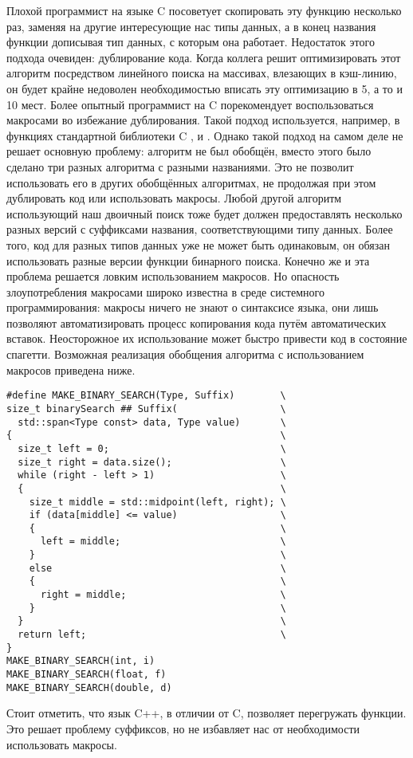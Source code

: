 Плохой программист на языке C посоветует скопировать эту функцию несколько раз, заменяя  на другие интересующие нас типы данных, а в конец названия функции дописывая тип данных, с которым она работает.
Недостаток этого подхода очевиден: дублирование кода.
Когда коллега решит оптимизировать этот алгоритм посредством линейного поиска на массивах, влезающих в кэш-линию, он будет крайне недоволен необходимостью вписать эту оптимизацию в 5, а то и 10 мест.
Более опытный программист на C порекомендует воспользоваться макросами во избежание дублирования.
Такой подход используется, например, в функциях стандартной библиотеки C ,  и .
Однако такой подход на самом деле не решает основную проблему: алгоритм не был обобщён, вместо этого было сделано три разных алгоритма с разными названиями.
Это не позволит использовать его в других обобщённых алгоритмах, не продолжая при этом дублировать код или использовать макросы.
Любой другой алгоритм использующий наш двоичный поиск тоже будет должен предоставлять несколько разных версий с суффиксами названия, соответствующими типу данных.
Более того, код для разных типов данных уже не может быть одинаковым, он обязан использовать разные версии функции бинарного поиска.
Конечно же и эта проблема решается ловким использованием макросов.
Но опасность злоупотребления макросами широко известна в среде системного программирования: макросы ничего не знают о синтаксисе языка, они лишь позволяют автоматизировать процесс копирования кода путём автоматических вставок.
Неосторожное их использование может быстро привести код в состояние спагетти.
Возможная реализация обобщения алгоритма  с использованием макросов приведена ниже.
\begin{verbatim}
#define MAKE_BINARY_SEARCH(Type, Suffix)        \
size_t binarySearch ## Suffix(                  \
  std::span<Type const> data, Type value)       \
{                                               \
  size_t left = 0;                              \
  size_t right = data.size();                   \
  while (right - left > 1)                      \
  {                                             \
    size_t middle = std::midpoint(left, right); \
    if (data[middle] <= value)                  \
    {                                           \
      left = middle;                            \
    }                                           \
    else                                        \
    {                                           \
      right = middle;                           \
    }                                           \
  }                                             \
  return left;                                  \
}
MAKE_BINARY_SEARCH(int, i)
MAKE_BINARY_SEARCH(float, f)
MAKE_BINARY_SEARCH(double, d)
\end{verbatim}
Стоит отметить, что язык C++, в отличии от C, позволяет перегружать функции.
Это решает проблему суффиксов, но не избавляет нас от необходимости использовать макросы.

